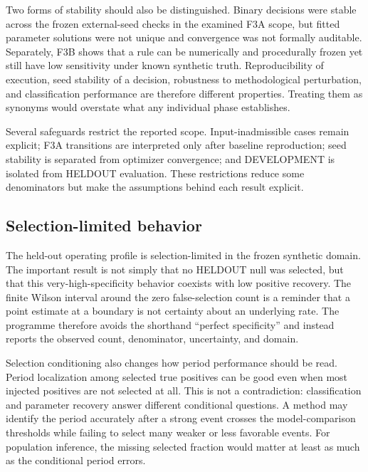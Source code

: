 \documentclass[manuscript,linenumbers]{aastex702}
\begin{document}
Two forms of stability should also be distinguished. Binary decisions were stable across the frozen external-seed checks in the examined F3A scope, but fitted parameter solutions were not unique and convergence was not formally auditable. Separately, F3B shows that a rule can be numerically and procedurally frozen yet still have low sensitivity under known synthetic truth. Reproducibility of execution, seed stability of a decision, robustness to methodological perturbation, and classification performance are therefore different properties. Treating them as synonyms would overstate what any individual phase establishes.

Several safeguards restrict the reported scope. Input-inadmissible cases remain explicit; F3A transitions are interpreted only after baseline reproduction; seed stability is separated from optimizer convergence; and DEVELOPMENT is isolated from HELDOUT evaluation. These restrictions reduce some denominators but make the assumptions behind each result explicit.

\subsection{Selection-limited behavior}
The held-out operating profile is selection-limited in the frozen synthetic domain. The important result is not simply that no HELDOUT null was selected, but that this very-high-specificity behavior coexists with low positive recovery. The finite Wilson interval around the zero false-selection count is a reminder that a point estimate at a boundary is not certainty about an underlying rate. The programme therefore avoids the shorthand ``perfect specificity'' and instead reports the observed count, denominator, uncertainty, and domain.

Selection conditioning also changes how period performance should be read. Period localization among selected true positives can be good even when most injected positives are not selected at all. This is not a contradiction: classification and parameter recovery answer different conditional questions. A method may identify the period accurately after a strong event crosses the model-comparison thresholds while failing to select many weaker or less favorable events. For population inference, the missing selected fraction would matter at least as much as the conditional period errors.
\end{document}
